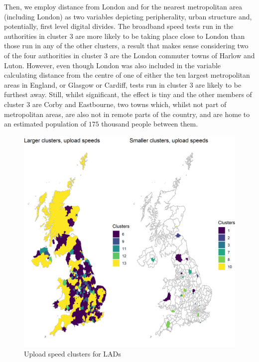 \documentclass[Royal,times,sageh]{sagej}
\begin{document}
Then, we employ distance from London and for the nearest metropolitan
area (including London) as two variables depicting peripherality, urban
structure and, potentially, first level digital divides. The broadband
speed tests run in the authorities in cluster \(3\) are more likely to
be taking place close to London than those run in any of the other
clusters, a result that makes sense considering two of the four
authorities in cluster \(3\) are the London commuter towns of Harlow and
Luton. However, even though London was also included in the variable
calculating distance from the centre of one of either the ten largest
metropolitan areas in England, or Glasgow or Cardiff, tests run in
cluster \(3\) are likely to be furthest away. Still, whilst significant,
the effect is tiny and the other members of cluster \(3\) are Corby and
Eastbourne, two towns which, whilst not part of metropolitan areas, are
also not in remote parts of the country, and are home to an estimated
population of \(175\) thousand people between them.

\begin{figure}
\includegraphics[width=0.95\linewidth]{figures/map.up.clusters} \caption{\label{map.up.clusters}Upload speed clusters for LADs}\label{fig:unnamed-chunk-6}
\end{figure}
\end{document}
